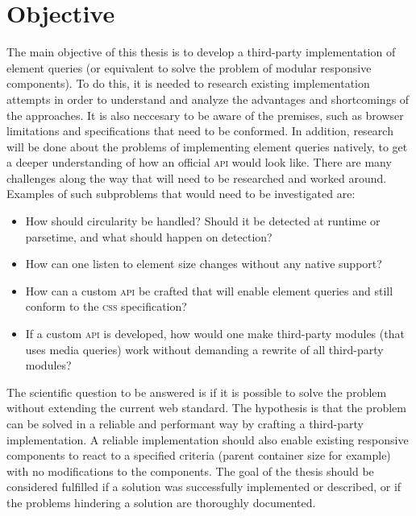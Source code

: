 \documentclass[a4paper,11pt]{kth-mag}
\begin{document}
    \section{Objective}
      The main objective of this thesis is to develop a third-party implementation of element queries (or equivalent to solve the problem of modular responsive components).
      To do this, it is needed to research existing implementation attempts in order to understand and analyze the advantages and shortcomings of the approaches.
      It is also neccesary to be aware of the premises, such as browser limitations and specifications that need to be conformed.
      In addition, research will be done about the problems of implementing element queries natively, to get a deeper understanding of how an official \textsc{api} would look like.
      There are many challenges along the way that will need to be researched and worked around.
      Examples of such subproblems that would need to be investigated are:
      \begin{itemize}
        \item How should circularity be handled? Should it be detected at runtime or parsetime, and what should happen on detection?
        \item How can one listen to element size changes without any native support?
        \item How can a custom \textsc{api} be crafted that will enable element queries and still conform to the \textsc{css} specification?
        \item If a custom \textsc{api} is developed, how would one make third-party modules (that uses media queries) work without demanding a rewrite of all third-party modules?
      \end{itemize}
      The scientific question to be answered is if it is possible to solve the problem  without extending the current web standard.
      The hypothesis is that the problem can be solved in a reliable and performant way by crafting a third-party implementation.
      A reliable implementation should also enable existing responsive components to react to a specified criteria (parent container size for example) with no modifications to the components.
      The goal of the thesis should be considered fulfilled if a solution was successfully implemented or described, or if the problems hindering a solution are thoroughly documented.
\end{document}
